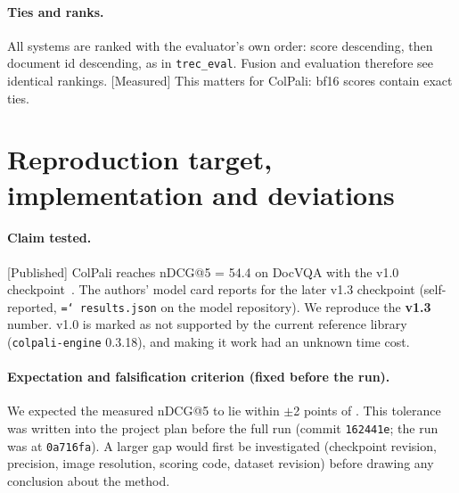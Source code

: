 \documentclass[11pt,a4paper]{article}
\newcommand{\lbl}[2]{\textsf{\scriptsize\textcolor{#1}{[#2]}}}
\newcommand{\Pub}{\lbl{tagP}{Published}}
\newcommand{\Mea}{\lbl{tagM}{Measured}}
\newcommand{\file}[1]{\texttt{\small\hyphenchar\font=`\/ #1}}
\begin{document}
\begin{table}[!htbp]\centering\small

\caption{\Mea{} The four top-ranked pages after fusion for one test query (\file{results/*\_docvqa/scores.npz}).}\label{tab:rrfexample}
\end{table}

\paragraph{Ties and ranks.} All systems are ranked with the evaluator's own order: score descending, then document id descending, as in \texttt{trec\_eval}. Fusion and evaluation therefore see identical rankings. \Mea{} This matters for ColPali: bf16 scores contain exact ties.

\section{Reproduction target, implementation and deviations}
\label{sec:repro}

\paragraph{Claim tested.}
\Pub{} ColPali reaches nDCG@5 = 54.4 on DocVQA with the v1.0 checkpoint~\cite[Table~2]{colpali}. The authors' model card reports \pubCard{} for the later v1.3 checkpoint (self-reported, \file{results.json} on the model repository).
We reproduce the \textbf{v1.3} number. v1.0 is marked as not supported by the current reference library (\texttt{colpali-engine} 0.3.18), and making it work had an unknown time cost.

\paragraph{Expectation and falsification criterion (fixed before the run).}
We expected the measured nDCG@5 to lie within $\pm$2 points of \pubCard{}. This tolerance was written into the project plan before the full run (commit \texttt{162441e}; the run was at \texttt{0a716fa}). A larger gap would first be investigated (checkpoint revision, precision, image resolution, scoring code, dataset revision) before drawing any conclusion about the method.
\end{document}
